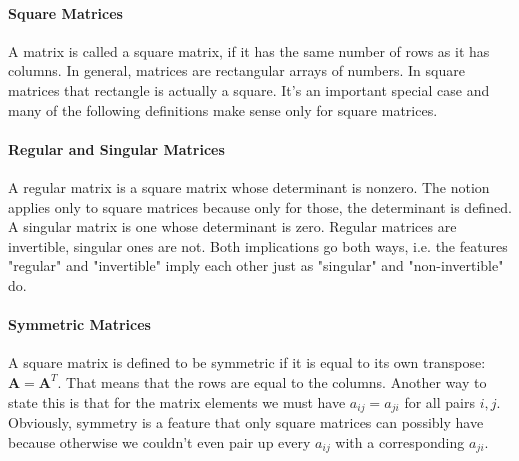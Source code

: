 

\paragraph{Square Matrices}
A matrix is called a square matrix, if it has the same number of rows as it has columns. In general, matrices are rectangular arrays of numbers. In square matrices that rectangle is actually a square. It's an important special case and many of the following definitions make sense only for square matrices.

\paragraph{Regular and Singular Matrices}
A regular matrix is a square matrix whose determinant is nonzero. The notion applies only to square matrices because only for those, the determinant is defined. A singular matrix is one whose determinant is zero. Regular matrices are invertible, singular ones are not. Both implications go both ways, i.e. the features "regular" and "invertible" imply each other just as "singular" and "non-invertible" do. %


\paragraph{Symmetric Matrices}
A square matrix is defined to be symmetric if it is equal to its own transpose: $\mathbf{A} = \mathbf{A}^T$. That means that the rows are equal to the columns. Another way to state this is that for the matrix elements we must have $a_{ij} = a_{ji}$ for all pairs $i,j$. Obviously, symmetry is a feature that only square matrices can possibly have because otherwise we couldn't even pair up every $a_{ij}$ with a corresponding $a_{ji}$.

